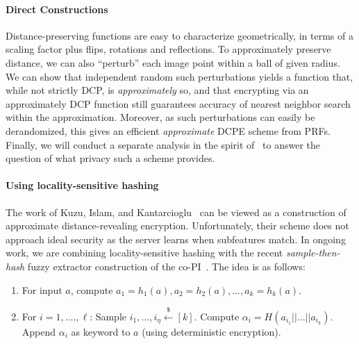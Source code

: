 \paragraph{Direct Constructions} Distance-preserving functions are easy to characterize geometrically, in terms of a scaling factor plus flips, rotations and reflections.  To approximately preserve distance, we can also  ``perturb'' each image point within a ball of given radius.  
We can show that independent random such perturbations yields a function that, while not strictly DCP, is \emph{approximately} so, and that encrypting via an approximately DCP function still guarantees accuracy of nearest neighbor  search within the approximation.  Moreover, as such perturbations can easily be derandomized, this gives an efficient \emph{approximate} DCPE scheme from PRFs.  Finally, we will conduct a separate analysis in the spirit of~\cite{C:BolCheOne11} to answer the question of what privacy such a scheme provides.  

\paragraph{Using locality-sensitive hashing}
The work of Kuzu, Islam, and Kantarcioglu~\cite{kuzu2012efficient} can be viewed as a construction of approximate distance-revealing encryption.  Unfortunately, their scheme does not approach ideal security as the server learns when subfeatures match.  In ongoing work, we are combining locality-sensitive hashing with the recent \emph{sample-then-hash} fuzzy extractor construction of the co-PI~\cite{EC:CFPRS16}.  The idea is as follows:

\begin{enumerate}
\item For input $a$, compute $a_1 = h_1(a), a_2 = h_2(a),..., a_k = h_k(a)$.
\item For $i=1,...., \ell$:
\subitem Sample $i_1,..., i_\eta\overset{\$}\leftarrow [k]$.
\subitem Compute $\alpha_i = H(a_{i_1} || ... || a_{i_k})$.
\subitem Append $\alpha_i$ as keyword to $a$ (using deterministic encryption).
\end{enumerate}

